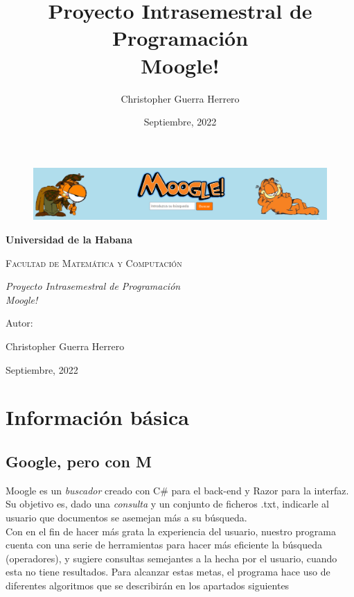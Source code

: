 \documentclass[a4paper,12pt]{article}
\title{Proyecto Intrasemestral de Programaci\'on\\Moogle!}
\author{Christopher Guerra Herrero}
\date{Septiembre, 2022}
\begin{document}
    \begin{figure}
        \begin{center}
            \includegraphics[scale=0.30]{Moogle.png}
        \end{center}
    \end{figure}

    \begin {titlepage}
        \centering
        {\bfseries\LARGE Universidad de la Habana \par}
        \vspace{1cm}
        {\scshape\Large Facultad de Matem\'atica y Computaci\'on \par}
        \vspace{3cm}
        {\itshape\Large Proyecto Intrasemestral de Programaci\'on\\ Moogle! \par}
        \vfill
        {\Large Autor: \par}
        {\Large Christopher Guerra Herrero \par}
        {\Large Septiembre, 2022}
    \end {titlepage}


    \newpage
    \section{Informaci\'on b\'asica}
        \subsection{Google, pero con M}
            Moogle es un {\it buscador} creado con C\# para el back-end y Razor para la
            interfaz. Su objetivo es, dado una {\it consulta} y un conjunto de ficheros
            .txt, indicarle al usuario que documentos se asemejan m\'as a su b\'usqueda.\\
                Con en el fin de hacer m\'as grata la experiencia del usuario, nuestro programa
            cuenta con una serie de herramientas para hacer m\'as eficiente la b\'usqueda (operadores),
             y sugiere consultas semejantes a la hecha por el usuario, cuando esta no tiene resultados.
            Para alcanzar estas metas, el programa hace uso de diferentes algoritmos que se
            describir\'an en los apartados siguientes
\end{document}
